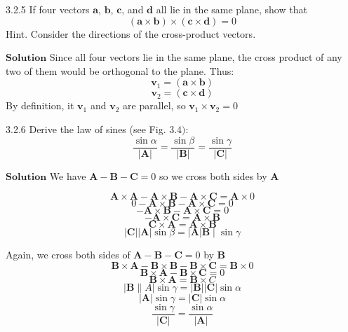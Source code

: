 \documentclass{article}
\begin{document}
\begin{flushleft}
$$$$



\begin{mybox}{3.2.5}
If four vectors $\mathbf{a}$, $\mathbf{b}$, $\mathbf{c}$, and $\mathbf{d}$ all lie in the same plane, show that
$$
(\mathbf{a} \times \mathbf{b}) \times(\mathbf{c} \times \mathbf{d})=0
$$
Hint. Consider the directions of the cross-product vectors.
\end{mybox}

$\boxed{\textbf{Solution}}$ Since all four vectors lie in the same plane, the cross product of any two of them would be orthogonal to the plane. Thus:
$$\mathbf{v}_1 = (\mathbf{a} \times \mathbf{b})$$
$$\mathbf{v}_2 = (\mathbf{c} \times \mathbf{d})$$
By definition, it $\mathbf{v}_1$ and $\mathbf{v}_2$ are parallel, so $\mathbf{v}_1 \times \mathbf{v}_2 = 0$


\newpage



\begin{mybox}{3.2.6}
Derive the law of sines (see Fig. $3.4):$
$$
\dfrac{\sin \alpha}{|\mathbf{A}|}=\dfrac{\sin \beta}{|\mathbf{B}|}=\dfrac{\sin \gamma}{|\mathbf{C}|}
$$
\end{mybox}


$\boxed{\textbf{Solution}}$ We have $\mathbf{A}-\mathbf{B}-\mathbf{C}=0$ so we cross both sides by $\mathbf{A}$ 



$$\mathbf{A} \times \mathbf{A}-\mathbf{A} \times \mathbf{B}-\mathbf{A} \times \mathbf{C}=\mathbf{A} \times 0$$
$$ 0-\mathbf{A} \times \mathbf{B}-\mathbf{A} \times \mathbf{C}=0$$
$$-\mathbf{A} \times \mathbf{B}-\mathbf{A} \times \mathbf{C}=0$$
$$-\mathbf{A} \times \mathbf{C}=\mathbf{A} \times \mathbf{B}$$
$$ \mathbf{C} \times \mathbf{A}=\mathbf{A} \times \mathbf{B}$$
$$|\mathbf{C}||\mathbf{A}| \sin \beta=|\mathbf{A}| \mathbf{B} \mid \sin \gamma$$

Again, we cross both sides of $\mathbf{A}-\mathbf{B}-\mathbf{C}=0$ by $\mathbf{B}$
$$\mathbf{B} \times \mathbf{A}-\mathbf{B} \times \mathbf{B}-\mathbf{B} \times \mathbf{C}=\mathbf{B} \times 0$$
$$ \mathbf{B} \times \mathbf{A}-\mathbf{B} \times \mathbf{C}=0$$
$$ \mathbf{B} \times \mathbf{A}=\mathbf{B} \times C$$
$$|\mathbf{B} \| A| \sin \gamma=|\mathbf{B}||\mathbf{C}| \sin \alpha$$
$$|\mathbf{A}| \sin \gamma=|\mathbf{C}| \sin \alpha$$
$$ \frac{\sin \gamma}{|\mathbf{C}|}=\frac{\sin \alpha}{|\mathbf{A}|} $$



\newpage




\end{flushleft}
\end{document}
